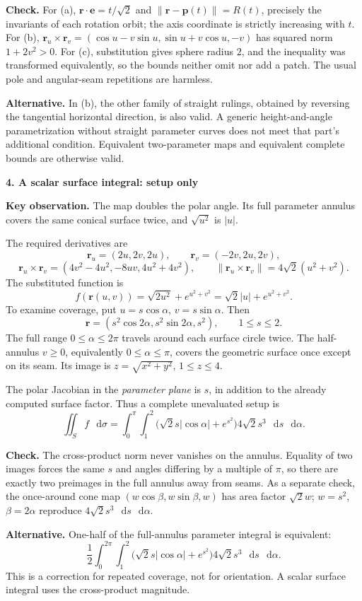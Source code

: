 \documentclass[11pt,letterpaper]{article}
\renewcommand{\vec}[1]{\mathbf{#1}}
\newcommand{\dd}{\mathop{}\!\mathrm{d}}
\newcommand{\solutionproblem}[3]{%
  \par\bigskip\Needspace{7\baselineskip}
  \noindent\textbf{#1. #2}\par\nobreak
}
\newcommand{\insight}[1]{\par\textbf{Key observation.} #1\par}
\newcommand{\verification}[1]{\par\textbf{Check.} #1\par}
\newcommand{\alternative}[1]{\par\textbf{Alternative.} #1\par}
\begin{document}
\verification{For (a), $\vec r\cdot\vec e=t/\sqrt2$ and
$\|\vec r-\vec p(t)\|=R(t)$, precisely the invariants of each rotation
orbit; the axis coordinate is strictly increasing with $t$. For (b),
$\vec r_u\times\vec r_v=(\cos u-v\sin u,\sin u+v\cos u,-v)$ has squared
norm $1+2v^2>0$. For (c), substitution gives sphere radius $2$, and the
inequality was transformed equivalently, so the bounds neither omit nor
add a patch. The usual pole and angular-seam repetitions are harmless.}
\alternative{In (b), the other family of straight rulings, obtained by
reversing the tangential horizontal direction, is also valid. A generic
height-and-angle parametrization without straight parameter curves does
not meet that part's additional condition. Equivalent two-parameter
maps and equivalent complete bounds are otherwise valid.}

\solutionproblem{4}{A scalar surface integral: setup only}{12}
\insight{The map doubles the polar angle. Its full parameter annulus
covers the same conical surface twice, and $\sqrt{u^2}$ is $|u|$.}
The required derivatives are
\[
\vec r_u=(2u,2v,2u),\qquad \vec r_v=(-2v,2u,2v),
\]
\[
\vec r_u\times\vec r_v
=(4v^2-4u^2,-8uv,4u^2+4v^2),\qquad
\|\vec r_u\times\vec r_v\|=4\sqrt2(u^2+v^2).
\]
The substituted function is
\[
f(\vec r(u,v))=\sqrt{2u^2}+e^{u^2+v^2}
=\sqrt2|u|+e^{u^2+v^2}.
\]
To examine coverage, put $u=s\cos\alpha$, $v=s\sin\alpha$. Then
\[
\vec r=(s^2\cos2\alpha,s^2\sin2\alpha,s^2),\qquad1\le s\le2.
\]
The full range $0\le\alpha\le2\pi$ travels around each surface circle
twice. The half-annulus $v\ge0$, equivalently $0\le\alpha\le\pi$,
covers the geometric surface once except on its seam. Its image is
$z=\sqrt{x^2+y^2}$, $1\le z\le4$.

The polar Jacobian in the \emph{parameter plane} is $s$, in addition
to the already computed surface factor. Thus a complete unevaluated
setup is
\[
\boxed{\iint_S f\,\dd\sigma
=\int_0^\pi\int_1^2
\bigl(\sqrt2 s|\cos\alpha|+e^{s^2}\bigr)
4\sqrt2 s^3\,\dd s\,\dd\alpha.}
\]
\verification{The cross-product norm never vanishes on the annulus.
Equality of two images forces the same $s$ and angles differing by a
multiple of $\pi$, so there are exactly two preimages in the full annulus
away from seams. As a separate check, the once-around cone map
$(w\cos\beta,w\sin\beta,w)$ has area factor $\sqrt2 w$;
$w=s^2$, $\beta=2\alpha$ reproduce $4\sqrt2 s^3\,\dd s\,\dd\alpha$.}
\alternative{One-half of the full-annulus parameter integral is equivalent:
\[
\frac12\int_0^{2\pi}\int_1^2
\bigl(\sqrt2 s|\cos\alpha|+e^{s^2}\bigr)
4\sqrt2 s^3\,\dd s\,\dd\alpha.
\]
This is a correction for repeated coverage, not for orientation. A
scalar surface integral uses the cross-product magnitude.}
\end{document}
